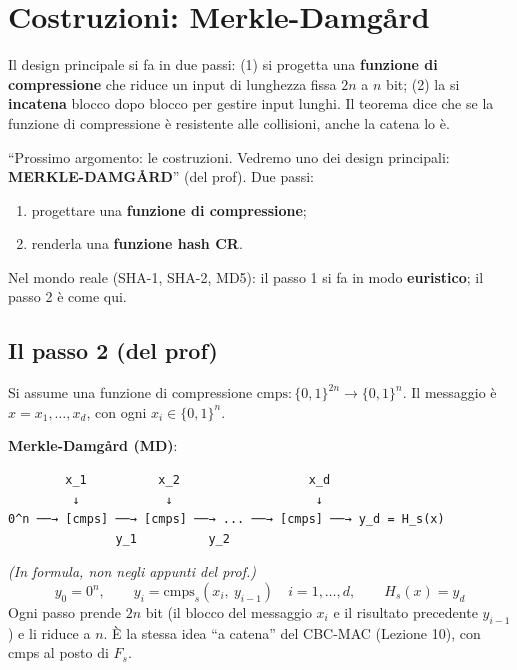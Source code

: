 \section{Costruzioni: Merkle-Damgård}

\begin{inbreve}
Il design principale si fa in due passi: (1) si progetta una \textbf{funzione di compressione} che riduce un input di lunghezza fissa \(2n\) a \(n\) bit; (2) la si \textbf{incatena} blocco dopo blocco per gestire input lunghi. Il teorema dice che se la funzione di compressione è resistente alle collisioni, anche la catena lo è.
\end{inbreve}

``Prossimo argomento: le costruzioni. Vedremo uno dei design principali: \textbf{MERKLE-DAMGÅRD}'' (del prof). Due passi:
\begin{enumerate}
  \item progettare una \textbf{funzione di compressione};
  \item renderla una \textbf{funzione hash CR}.
\end{enumerate}
Nel mondo reale (SHA-1, SHA-2, MD5): il passo 1 si fa in modo \textbf{euristico}; il passo 2 è come qui.

\subsection{Il passo 2 (del prof)}

Si assume una funzione di compressione \(\text{cmps} : \{0,1\}^{2n} \to \{0,1\}^n\). Il messaggio è \(x = x_1, \dots, x_d\), con ogni \(x_i \in \{0,1\}^n\).

\textbf{Merkle-Damgård (MD)}:

\begin{verbatim}
        x_1          x_2                  x_d
         ↓            ↓                    ↓
0^n ──→ [cmps] ──→ [cmps] ──→ ... ──→ [cmps] ──→ y_d = H_s(x)
               y_1          y_2
\end{verbatim}

\begin{nota}
\emph{(In formula, non negli appunti del prof.)}
\[
y_0 = 0^n, \qquad y_i = \text{cmps}_s(x_i,\ y_{i-1}) \quad i = 1, \dots, d, \qquad H_s(x) = y_d
\]
Ogni passo prende \(2n\) bit (il blocco del messaggio \(x_i\) e il risultato precedente \(y_{i-1}\)) e li riduce a \(n\). È la stessa idea ``a catena'' del CBC-MAC (Lezione 10), con cmps al posto di \(F_s\).
\end{nota}

